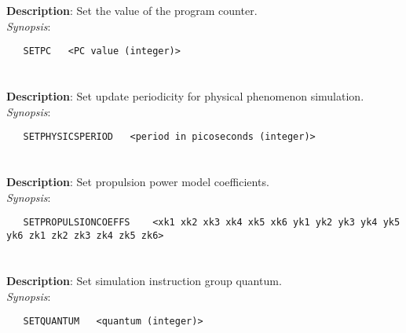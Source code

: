 \section{\quad{}}
\label{manpages:SETPC}
\label{manpages:setpc}
\vspace{-0.1in}
{\bf Description}: 	Set the value of the program counter.\\[1.5ex]
{\em Synopsis}:
\vspace{-0.05in}
\scriptsize
\begin{lstlisting}
   SETPC   <PC value (integer)>							
\end{lstlisting}
\normalsize
\vspace{-0.05in}


\section{\quad{}}
\label{manpages:SETPHYSICSPERIOD}
\label{manpages:setphysicsperiod}
\vspace{-0.1in}
{\bf Description}: 	Set update periodicity for physical phenomenon simulation.\\[1.5ex]
{\em Synopsis}:
\vspace{-0.05in}
\scriptsize
\begin{lstlisting}
   SETPHYSICSPERIOD   <period in picoseconds (integer)>														
\end{lstlisting}
\normalsize
\vspace{-0.05in}


\section{\quad{}}
\label{manpages:SETPROPULSIONCOEFFS}
\label{manpages:setpropulsioncoeffs}
\vspace{-0.1in}
{\bf Description}: 	Set propulsion power model coefficients.\\[1.5ex]
{\em Synopsis}:
\vspace{-0.05in}
\scriptsize
\begin{lstlisting}
   SETPROPULSIONCOEFFS    <xk1 xk2 xk3 xk4 xk5 xk6 yk1 yk2 yk3 yk4 yk5 yk6 zk1 zk2 zk3 zk4 zk5 zk6>											
\end{lstlisting}
\normalsize
\vspace{-0.05in}


\section{\quad{}}
\label{manpages:SETQUANTUM}
\label{manpages:setquantum}
\vspace{-0.1in}
{\bf Description}: 	Set simulation instruction group quantum.\\[1.5ex]
{\em Synopsis}:
\vspace{-0.05in}
\scriptsize
\begin{lstlisting}
   SETQUANTUM   <quantum (integer)>																		
\end{lstlisting}
\normalsize
\vspace{-0.05in}


